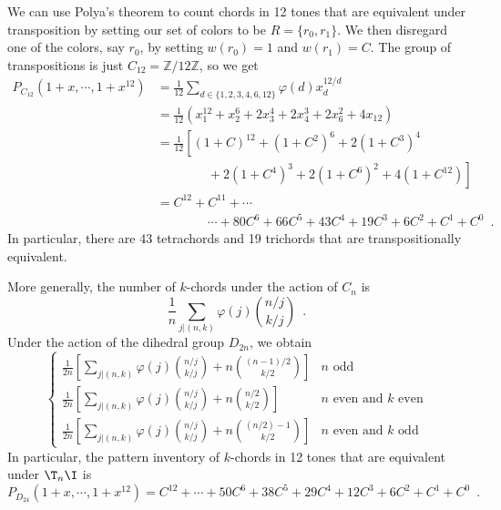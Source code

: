 \begin{example}
	We can use Polya's theorem to count chords in 12 tones that are equivalent under
	transposition by setting our set of colors to be $R = \{ r_0, r_1 \}$. We then disregard
	one of the colors, say $r_0$, by setting $w(r_0) = 1$ and $w(r_1) = C$. The group of
	transpositions is just $C_{12} = \mathbb{Z} / 12 \mathbb{Z}$, so we get
		\begin{align}
			P_{C_{12}}(1 + x, \cdots, 1 + x^{12})
			& = \frac{1}{12} \sum_{d \in \{ 1, 2, 3, 4, 6, 12 \}} \varphi(d) x_d^{12 / d} \\
			& = \frac{1}{12} \left( x_1^{12} + x_2^{6} + 2 x_3^{4} + 2 x_4^{3} +
			2 x_6^{2} + 4 x_{12} \right) \\
			& = \frac{1}{12} \left[ (1 + C)^{12} + (1 + C^2)^{6} + 2 (1 + C^3)^{4} \right. \\
			& \qquad \qquad
			+ \left. 2 (1 + C^4)^{3} + 2 (1 + C^6)^{2} + 4 (1 + C^{12}) \right] \\
			& = C^{12} + C^{11} + \cdots \\
			& \qquad \qquad
			\cdots + 80 C^6 + 66 C^5 + 43 C^4 + 19 C^3 + 6 C^2 + C^1 + C^0 \enspace.
		\end{align}
	In particular, there are 43 tetrachords and 19 trichords that are transpositionally
	equivalent.
\end{example}

\begin{example}
	\cite[53]{Reiner1985}
	More generally, the number of $k$-chords under the action of $C_n$ is
	\begin{equation}
		\frac{1}{n} \sum_{j | (n, k)} \varphi(j) {{n / j}\choose{k / j}} \enspace.
	\end{equation}
	Under the action of the dihedral group $D_{2n}$, we obtain
	\begin{equation}
		\begin{cases}
 			\frac{1}{2n} \left[ \sum_{j | (n, k)} \varphi(j) {{n / j}\choose{k / j}} +
 			n {{(n - 1) / 2} \choose{k / 2}} \right] & n \text{ odd} \\
 			\frac{1}{2n} \left[ \sum_{j | (n, k)} \varphi(j) {{n / j}\choose{k / j}} +
 			n {{n / 2} \choose{k / 2}} \right] & n \text{ even and } k \text{ even} \\
 			\frac{1}{2n} \left[ \sum_{j | (n, k)} \varphi(j) {{n / j}\choose{k / j}} +
 			n {{(n / 2) - 1} \choose{k / 2}} \right] & n \text{ even and } k \text{ odd}
 		\end{cases}
	\end{equation}
	In particular, the pattern inventory of $k$-chords in 12 tones that are equivalent under
	$\T_n \I$ is
	\begin{equation}
		P_{D_{24}}(1 + x, \cdots, 1 + x^{12}) = C^{12} + \cdots + 50 C^6 +
		38 C^5 + 29 C^4 + 12 C^3 + 6 C^2 + C^1 + C^0 \enspace.
	\end{equation}
\end{example}

